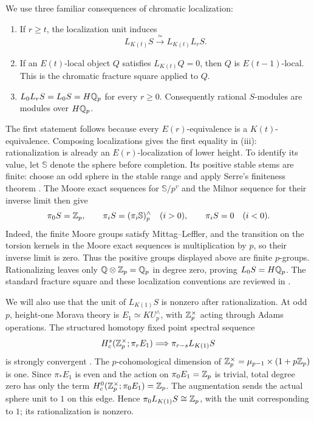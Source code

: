 We use three familiar consequences of chromatic localization:
\begin{enumerate}[label=(\roman*)]
\item If \(r\geq t\), the localization unit induces
\[
 L_{K(t)}S \xrightarrow{\;\simeq\;} L_{K(t)}L_rS.
\]
\item If an \(E(t)\)-local object \(Q\) satisfies \(L_{K(t)}Q=0\),
then \(Q\) is \(E(t-1)\)-local. This is the chromatic fracture square
applied to \(Q\).
\item \(L_0L_rS=L_0S=H\mathbb Q_p\) for every \(r\geq0\).
Consequently rational \(S\)-modules are modules over \(H\mathbb Q_p\).
\end{enumerate}
The first statement follows because every \(E(r)\)-equivalence is a
\(K(t)\)-equivalence. Composing localizations gives the first equality
in (iii): rationalization is already an \(E(r)\)-localization of lower
height. To identify its value, let \(\mathbb S\) denote the sphere before
completion. Its positive stable stems are finite: choose an odd sphere
in the stable range and apply Serre's finiteness theorem
\cite[Chapter~V, Section~3, Proposition~3]{Serre1951}.
The Moore exact sequences for \(\mathbb S/p^v\) and the Milnor sequence
for their inverse limit then give
\[
\pi_0S=\mathbb Z_p,\qquad
\pi_iS=(\pi_i\mathbb S)^{\wedge}_p\quad(i>0),\qquad
\pi_iS=0\quad(i<0).
\]
Indeed, the finite Moore groups satisfy Mittag--Leffler, and the
transition on the torsion kernels in the Moore exact sequences is
multiplication by \(p\), so their inverse limit is zero. Thus the
positive groups displayed above are finite \(p\)-groups. Rationalizing
leaves only \(\mathbb Q\otimes\mathbb Z_p=\mathbb Q_p\) in degree zero, proving \(L_0S=H\mathbb Q_p\).
The standard fracture square and these localization conventions are
reviewed in \cite[Section~2]{BB}.

We will also use that the unit of \(L_{K(1)}S\) is nonzero after
rationalization. At odd \(p\), height-one Morava theory is
\(E_1\simeq KU_p^\wedge\), with \(\mathbb Z_p^\times\) acting through
Adams operations. The structured homotopy fixed point spectral sequence
\[
H_c^s(\mathbb Z_p^\times;\pi_rE_1)
\Longrightarrow \pi_{r-s}L_{K(1)}S
\]
is strongly convergent
\cite[Theorem~1(iii)--(iv) and pp.~2--3]{DevinatzHopkins}.
The \(p\)-cohomological dimension of
\(\mathbb Z_p^\times=\mu_{p-1}\times(1+p\mathbb Z_p)\) is one. Since
\(\pi_*E_1\) is even and the action on \(\pi_0E_1=\mathbb Z_p\) is
trivial, total degree zero has only the term
\(H_c^0(\mathbb Z_p^\times;\pi_0E_1)=\mathbb Z_p\). The augmentation sends the
actual sphere unit to \(1\) on this edge. Hence
\(\pi_0L_{K(1)}S\cong\mathbb Z_p\), with the unit corresponding to \(1\);
its rationalization is nonzero.

